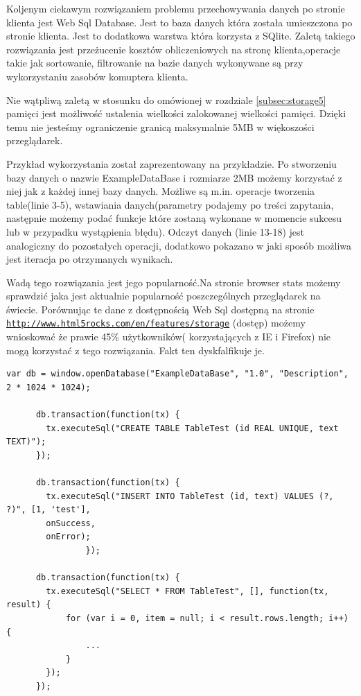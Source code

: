 Koljenym ciekawym rozwiązaniem problemu przechowywania danych po stronie klienta jest Web Sql Database. 
Jest to baza danych która została umieszczona po stronie klienta. Jest to dodatkowa warstwa która korzysta z SQlite.
Zaletą takiego rozwiązania jest przeżucenie kosztów obliczeniowych na stronę klienta,operacje takie jak sortowanie, filtrowanie na bazie danych wykonywane są przy wykorzystaniu zasobów komuptera klienta.

Nie wątpliwą zaletą w stosunku do omówionej w rozdziale \ref{subsec:storage5} pamięci jest możliwość ustalenia wielkości zalokowanej wielkości pamięci. Dzięki temu nie jesteśmy ograniczenie granicą maksymalnie 5MB w więkoszości przeglądarek. 

Przykład wykorzystania został zaprezentowany na przykładzie. Po stworzeniu bazy danych o nazwie ExampleDataBase i rozmiarze 2MB możemy korzystać z niej jak z każdej innej bazy danych. Możliwe są m.in. operacje tworzenia table(linie 3-5), wstawiania danych(parametry podajemy po treści zapytania, następnie możemy podać funkcje które zostaną wykonane w momencie sukcesu lub w przypadku wystąpienia błędu). Odczyt danych (linie 13-18) jest analogiczny do pozostałych operacji, dodatkowo pokazano w jaki sposób możliwa jest iteracja po otrzymanych wynikach.

Wadą tego rozwiązania jest jego popularność.Na stronie browser stats  możemy sprawdzić jaka jest aktualnie popularność poszczególnych przeglądarek na świecie. Porównując te dane z dostępnością Web Sql dostępną na stronie \underline{\texttt{http://www.html5rocks.com/en/features/storage}} (dostęp) możemy wnioskować że prawie 45\% użytkowników( korzystających z IE i Firefox) nie mogą korzystać z tego rozwiązania. Fakt ten dyskfalfikuje je.

\lstset{language=JavaScript}
\label{lis:webSql}
\begin{lstlisting}[caption=json]
      var db = window.openDatabase("ExampleDataBase", "1.0", "Description", 2 * 1024 * 1024);
      
      db.transaction(function(tx) {
        tx.executeSql("CREATE TABLE TableTest (id REAL UNIQUE, text TEXT)");
      });
      
      db.transaction(function(tx) {
        tx.executeSql("INSERT INTO TableTest (id, text) VALUES (?, ?)", [1, 'test'],
        onSuccess,
        onError);
                });
                
      db.transaction(function(tx) {
        tx.executeSql("SELECT * FROM TableTest", [], function(tx, result) {
            for (var i = 0, item = null; i < result.rows.length; i++) {
                ...
			}
        });
      });
\end{lstlisting}

